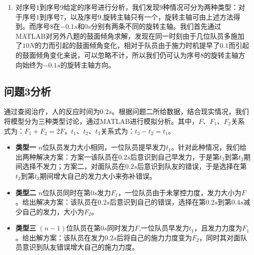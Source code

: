 \documentclass{cumcm}
\begin{document}
\begin{enumerate}
\item 对序号$1$到序号$9$给定的序号进行分析，我们发现$9$种情况可分为两种类型：对于序号$1$到序号$7$，以及序号$9$,旋转主轴只有一个，旋转主轴可由上述方法得到。而序号$8$在$-0.1s$和$0s$分别有两条不同的旋转主轴。我们首先通过MATLAB对另外八题的鼓面倾角求解，发现在同一时刻由于几位队员多施加了$10N$的力而引起的鼓面倾角变化，相对于队员由于施力时机提早了$0.1$而引起的鼓面倾角变化来说，可以忽略不计，所以我们仍可认为序号$8$的旋转主轴方向始终为$-0.1s$的旋转主轴方向。
\end{enumerate}

\subsection{问题3分析}
通过查阅治疗，人的反应时间为$0.2s$。根据问题二所给数据，结合现实情况，我们将模型分为三种类型讨论，通过MATLAB进行模拟分析。其中，$F$、$F_1$、$F_2$关系式为：$F_1+F_2=2F$，$t_1$、$t_2$、$t_3$关系式为：$t_3-t_2=t_1$。
\begin{itemize}
\item \textbf{类型一} \quad $n$位队员发力大小相同，一位队员提早发力$t_1$。针对此种情况，我们给出两种解决方案：方案一该队员在$0.2s$后意识到自己早发力，于是第$t_2$到第$t_3$期间选择不发力；方案二，对面队员在$0.2s$后意识到队友的错误，于是选择在第$t_2$到第$t_3$期间增大自己的发力大小来弥补错误。
\item \textbf{类型二} \quad $n$位队员同时在第$0s$发力$F_1$，一位队员由于未掌控力度，发力大小为$F$。给出解决方案：该队员在$0.2s$后意识到自己的错误，选择在第$0.2s$到第$0.4s$减少自己的发力，大小为$F_2$。
\item \textbf{类型三} \quad $(n-1)$位队员在第$0s$同时发力$F$,一位队员早发力$t_1$，且发力力度为$F_1$。给出解方案：该队员在发力$0.2s$后将自己的施力力度变为$F_2$，同时其对面队员意识到队友错误增大自己的施力力度。

\end{itemize}
\end{document}
